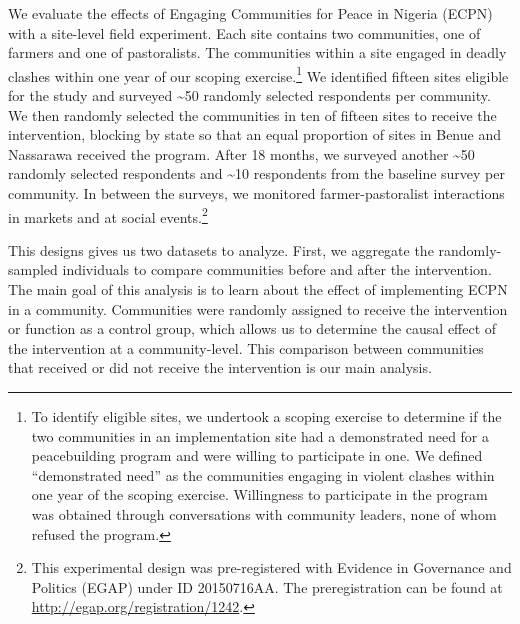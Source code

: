 \documentclass[11pt]{article}
\begin{document}
We evaluate the effects of Engaging Communities for Peace in Nigeria
(ECPN) with a site-level field experiment. Each site contains two
communities, one of farmers and one of pastoralists. The communities
within a site engaged in deadly clashes within one year of our scoping
exercise.\footnote{To identify eligible sites, we undertook a scoping
  exercise to determine if the two communities in an implementation site
  had a demonstrated need for a peacebuilding program and were willing
  to participate in one. We defined ``demonstrated need'' as the
  communities engaging in violent clashes within one year of the scoping
  exercise. Willingness to participate in the program was obtained
  through conversations with community leaders, none of whom refused the
  program.} We identified fifteen sites eligible for the study and
surveyed \textasciitilde50 randomly selected respondents per community.
We then randomly selected the communities in ten of fifteen sites to
receive the intervention, blocking by state so that an equal proportion
of sites in Benue and Nassarawa received the program. After 18 months,
we surveyed another \textasciitilde50 randomly selected respondents and
\textasciitilde10 respondents from the baseline survey per community. In
between the surveys, we monitored farmer-pastoralist interactions in
markets and at social events.\footnote{This experimental design was
  pre-registered with Evidence in Governance and Politics (EGAP) under
  ID 20150716AA. The preregistration can be found at
  \url{http://egap.org/registration/1242}.}

This designs gives us two datasets to analyze. First, we aggregate the
randomly-sampled individuals to compare communities before and after the
intervention. The main goal of this analysis is to learn about the
effect of implementing ECPN in a community. Communities were randomly
assigned to receive the intervention or function as a control group,
which allows us to determine the causal effect of the intervention at a
community-level. This comparison between communities that received or
did not receive the intervention is our main analysis.
\end{document}
